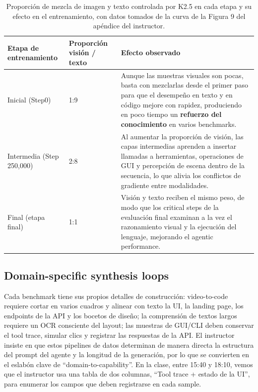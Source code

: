 \documentclass[a4paper]{article}
\begin{document}
\begin{table}[H]
\footnotesize
\centering
\begin{tabular}{p{3cm}p{4cm}p{7cm}}
\toprule
Etapa de entrenamiento & Proporción visión / texto & Efecto observado \\
\midrule
Inicial (Step0) & 1:9 & Aunque las muestras visuales son pocas, basta con mezclarlas desde el primer paso para que el desempeño en texto y en código mejore con rapidez, produciendo en poco tiempo un \textbf{refuerzo del conocimiento} en varios benchmarks. \\
Intermedia (Step 250,000) & 2:8 & Al aumentar la proporción de visión, las capas intermedias aprenden a insertar llamadas a herramientas, operaciones de GUI y percepción de escena dentro de la secuencia, lo que alivia los conflictos de gradiente entre modalidades. \\
Final (etapa final) & 1:1 & Visión y texto reciben el mismo peso, de modo que los critical steps de la evaluación final examinan a la vez el razonamiento visual y la ejecución del lenguaje, mejorando el agentic performance. \\
\bottomrule
\end{tabular}
\caption{Proporción de mezcla de imagen y texto controlada por K2.5 en cada etapa y su efecto en el entrenamiento, con datos tomados de la curva de la Figura 9 del apéndice del instructor.}
\end{table}

\subsection{Domain-specific synthesis loops}
Cada benchmark tiene sus propios detalles de construcción: video-to-code requiere cortar en varios cuadros y alinear con texto la UI, la landing page, los endpoints de la API y los bocetos de diseño; la comprensión de textos largos requiere un OCR consciente del layout; las muestras de GUI/CLI deben conservar el tool trace, simular clics y registrar las respuestas de la API. El instructor insiste en que estos pipelines de datos determinan de manera directa la estructura del prompt del agente y la longitud de la generación, por lo que se convierten en el eslabón clave de ``domain-to-capability''. En la clase, entre 15:40 y 18:10, vemos que el instructor usa una tabla de dos columnas, ``Tool trace + estado de la UI'', para enumerar los campos que deben registrarse en cada sample.
\end{document}
